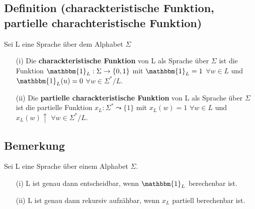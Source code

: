 \subsection{Definition (charackteristische Funktion, partielle charachteristische Funktion)} Sei L eine Sprache über dem Alphabet $\Sigma$
\begin{itemize}
  \item [(i)] Die \textbf{charackteristische Funktion} von L als Sprache über $\Sigma$ ist die Funktion $\mathbbm{1}_L : \Sigma \rightarrow \{0, 1\}$ mit $\mathbbm{1}_L = 1$ $\forall w \in L$ und $\mathbbm{1}_L (u) = 0$ $\forall w \in \Sigma^* / L$.
  \item [(ii)] Die \textbf{ partielle charackteristische Funktion} von L als Sprache über $\Sigma$ ist die partielle Funktion $x_L : \Sigma^* \leadsto \{1\}$ mit $x_L(w) = 1$ $\forall w \in L$ und $x_L(w) \uparrow$  $\forall w \in \Sigma^* / L.$ 
\end{itemize}

\subsection{Bemerkung} Sei L eine Sprache über einem Alphabet $\Sigma$. 
\begin{itemize}
  \item [(i)] L ist genau dann entscheidbar, wenn $\mathbbm{1}_L$ berechenbar ist.
  \item [(ii)] L ist genau dann rekursiv aufzähbar, wenn $x_L$ partiell berechenbar ist.
\end{itemize}

